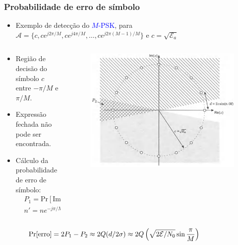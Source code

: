 \begin{frame}
	\frametitle{Probabilidade de erro de símbolo}

	\begin{itemize}
	    \item Exemplo de detecção do \textcolor{blue}{$M$-PSK}, para $\mathcal{A}=\{c, ce^{j2\pi/M}, ce^{j4\pi/M}, \ldots, ce^{j2\pi(M-1)/M} \}$ e $c=\sqrt{\mathcal{E}_a}$
	\end{itemize}
	\begin{columns}
		\begin{column}{0.55\textwidth}
		    \begin{itemize}
			\item Região de decisão do símbolo $c$ entre $-\pi/M$ e $\pi/M$.
			\item Expressão fechada não pode ser encontrada.
			\item Cálculo da probabilidade de erro de símbolo:			
			\begin{align*}
			    &P_1 = \text{Pr}[\mathrm{Im}\{n'\} > d/2] = Q(d/2\sigma) \\
			    &n' = ne^{-j\pi/M}			    
			\end{align*}
		    \end{itemize}		    
		\end{column}
		\begin{column}{0.45\textwidth}
		    \begin{figure}[t]	
			\begin{center}\vspace{-0.5cm}
			    \includegraphics[width=\columnwidth]{figs/pam_47}
			\end{center}
			\end{figure}
		\end{column}
	\end{columns}	    	
	\begin{equation*}\hspace{-1.5cm}
	    \text{Pr[erro]} = 2P_1 - P_2 \approx 2Q(d/2\sigma) \approx2Q\left( \sqrt{2\mathcal{E}/N_0} \sin\frac{\pi}{M} \right)
	\end{equation*}	
\end{frame}


